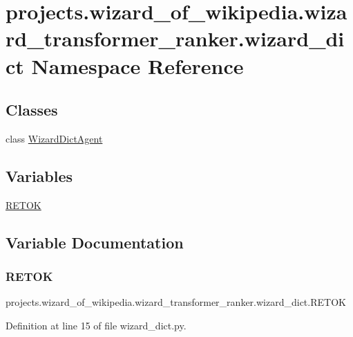 \hypertarget{namespaceprojects_1_1wizard__of__wikipedia_1_1wizard__transformer__ranker_1_1wizard__dict}{}\section{projects.\+wizard\+\_\+of\+\_\+wikipedia.\+wizard\+\_\+transformer\+\_\+ranker.\+wizard\+\_\+dict Namespace Reference}
\label{namespaceprojects_1_1wizard__of__wikipedia_1_1wizard__transformer__ranker_1_1wizard__dict}
\subsection*{Classes}
\begin{DoxyCompactItemize}
\item 
class \hyperlink{classprojects_1_1wizard__of__wikipedia_1_1wizard__transformer__ranker_1_1wizard__dict_1_1WizardDictAgent}{Wizard\+Dict\+Agent}
\end{DoxyCompactItemize}
\subsection*{Variables}
\begin{DoxyCompactItemize}
\item 
\hyperlink{namespaceprojects_1_1wizard__of__wikipedia_1_1wizard__transformer__ranker_1_1wizard__dict_a7d0602ca809535e0fb49318ed85a0dec}{R\+E\+T\+OK}
\end{DoxyCompactItemize}


\subsection{Variable Documentation}
\mbox{\label{namespaceprojects_1_1wizard__of__wikipedia_1_1wizard__transformer__ranker_1_1wizard__dict_a7d0602ca809535e0fb49318ed85a0dec}} 
\subsubsection{\texorpdfstring{R\+E\+T\+OK}{RETOK}}
{\footnotesize\ttfamily projects.\+wizard\+\_\+of\+\_\+wikipedia.\+wizard\+\_\+transformer\+\_\+ranker.\+wizard\+\_\+dict.\+R\+E\+T\+OK}



Definition at line 15 of file wizard\+\_\+dict.\+py.

